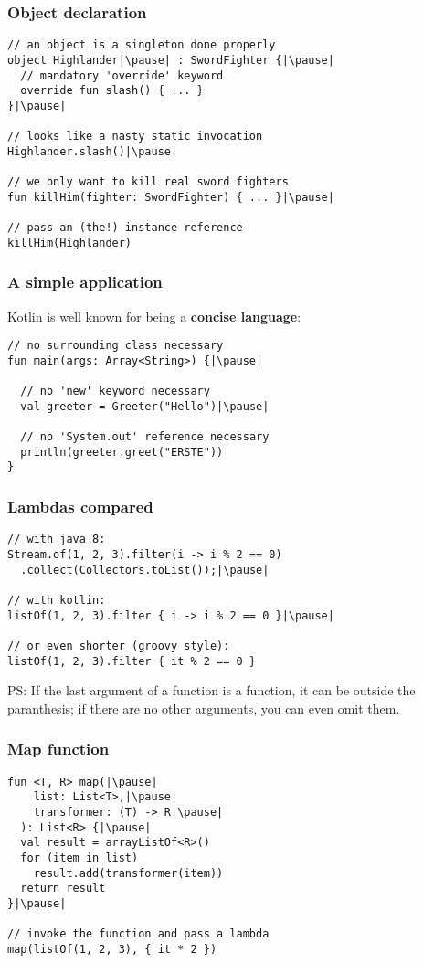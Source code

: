 \begin{frame}[fragile] \frametitle{Object declaration}
\pause
\begin{lstlisting}
// an object is a singleton done properly
object Highlander|\pause| : SwordFighter {|\pause|
  // mandatory 'override' keyword
  override fun slash() { ... }
}|\pause|

// looks like a nasty static invocation
Highlander.slash()|\pause|

// we only want to kill real sword fighters
fun killHim(fighter: SwordFighter) { ... }|\pause|

// pass an (the!) instance reference
killHim(Highlander)
\end{lstlisting}
\end{frame}


\begin{frame}[fragile] \frametitle{A simple application}
Kotlin is well known for being a \textbf{concise language}:\pause
\begin{lstlisting}
// no surrounding class necessary
fun main(args: Array<String>) {|\pause|

  // no 'new' keyword necessary
  val greeter = Greeter("Hello")|\pause|

  // no 'System.out' reference necessary
  println(greeter.greet("ERSTE"))
}
\end{lstlisting}
\end{frame}

\begin{frame}[fragile] \frametitle{Lambdas compared}
\pause
\begin{lstlisting}
// with java 8:
Stream.of(1, 2, 3).filter(i -> i % 2 == 0)
  .collect(Collectors.toList());|\pause|

// with kotlin:
listOf(1, 2, 3).filter { i -> i % 2 == 0 }|\pause|

// or even shorter (groovy style):
listOf(1, 2, 3).filter { it % 2 == 0 }
\end{lstlisting}
\pause
\small{PS: If the last argument of a function is a function, it can be outside the paranthesis; if there are no other arguments, you can even omit them.}
\end{frame}

\begin{frame}[fragile] \frametitle{Map function}
\pause
\begin{lstlisting}
fun <T, R> map(|\pause|
    list: List<T>,|\pause|
    transformer: (T) -> R|\pause|
  ): List<R> {|\pause|
  val result = arrayListOf<R>()
  for (item in list)
    result.add(transformer(item))
  return result
}|\pause|

// invoke the function and pass a lambda
map(listOf(1, 2, 3), { it * 2 })
\end{lstlisting}
\end{frame}


